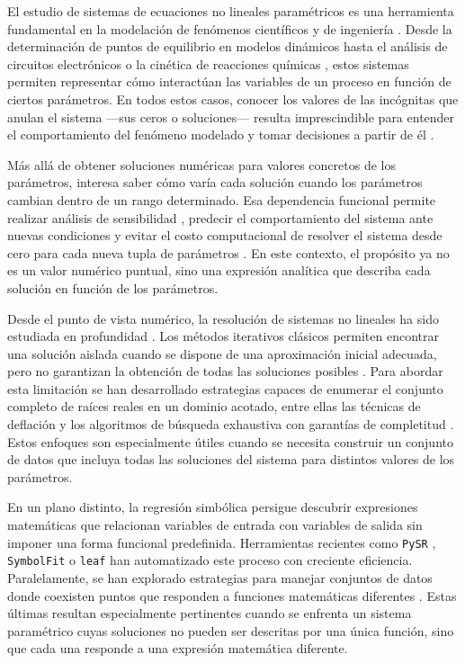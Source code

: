 \begin{introduction}

El estudio de sistemas de ecuaciones no lineales paramétricos es una herramienta fundamental en la modelación de fenómenos científicos y de ingeniería \cite{gershenfeld2012nature}. Desde la determinación de puntos de equilibrio en modelos dinámicos \cite{strogatz2018nonlinear} hasta el análisis de circuitos electrónicos \cite{horowitz2015art} o la cinética de reacciones químicas \cite{laidler1987chemical}, estos sistemas permiten representar cómo interactúan las variables de un proceso en función de ciertos parámetros. En todos estos casos, conocer los valores de las incógnitas que anulan el sistema —sus ceros o soluciones— resulta imprescindible para entender el comportamiento del fenómeno modelado y tomar decisiones a partir de él \cite{allgower1990numerical}.

Más allá de obtener soluciones numéricas para valores concretos de los parámetros, interesa saber cómo varía cada solución cuando los parámetros cambian dentro de un rango determinado. Esa dependencia funcional permite realizar análisis de sensibilidad \cite{saltelli2008global}, predecir el comportamiento del sistema ante nuevas condiciones \cite{forrester2008engineering} y evitar el costo computacional de resolver el sistema desde cero para cada nueva tupla de parámetros \cite{eldred2009formulations}. En este contexto, el propósito ya no es un valor numérico puntual, sino una expresión analítica que describa cada solución en función de los parámetros.

Desde el punto de vista numérico, la resolución de sistemas no lineales ha sido estudiada en profundidad \cite{burden2010numerical}. Los métodos iterativos clásicos \cite{nocedal2006numerical} permiten encontrar una solución aislada cuando se dispone de una aproximación inicial adecuada, pero no garantizan la obtención de todas las soluciones posibles \cite{meleshko1991nonlinear}. Para abordar esta limitación se han desarrollado estrategias capaces de enumerar el conjunto completo de raíces reales en un dominio acotado, entre ellas las técnicas de deflación \cite{ojika1983deflation} y los algoritmos de búsqueda exhaustiva con garantías de completitud \cite{bartnik2024mdcm}. Estos enfoques son especialmente útiles cuando se necesita construir un conjunto de datos que incluya todas las soluciones del sistema para distintos valores de los parámetros.

En un plano distinto, la regresión simbólica \cite{koza1992genetic} persigue descubrir expresiones matemáticas que relacionan variables de entrada con variables de salida sin imponer una forma funcional predefinida. Herramientas recientes como \texttt{PySR} \cite{cranmer2023pysr}, \texttt{SymbolFit} \cite{diniz2025symbolfit} o \texttt{leaf} \cite{leaf2024} han automatizado este proceso con creciente eficiencia. Paralelamente, se han explorado estrategias para manejar conjuntos de datos donde coexisten puntos que responden a funciones matemáticas diferentes \cite{ukorigho2023competitive}. Estas últimas resultan especialmente pertinentes cuando se enfrenta un sistema paramétrico cuyas soluciones no pueden ser descritas por una única función, sino que cada una responde a una expresión matemática diferente.


\end{introduction}
